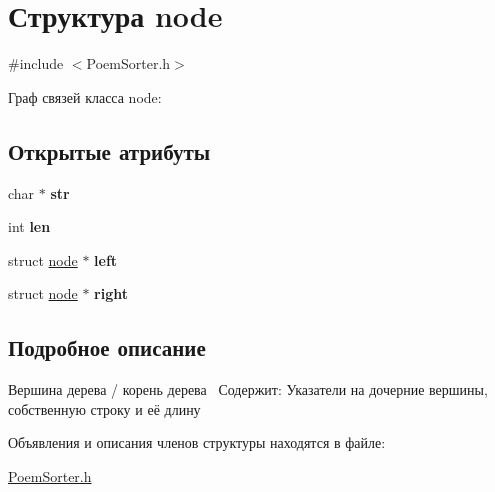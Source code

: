 \hypertarget{structnode}{}\section{Структура node}
\label{structnode}


{\ttfamily \#include $<$Poem\+Sorter.\+h$>$}



Граф связей класса node\+:
\subsection*{Открытые атрибуты}
\begin{DoxyCompactItemize}
\item 
\mbox{\label{structnode_ab87bb77f53624928d8241d835150524e}} 
char $\ast$ {\bfseries str}
\item 
\mbox{\label{structnode_a3f3dc96b95e9ee02b79ff034a5175bee}} 
int {\bfseries len}
\item 
\mbox{\label{structnode_a3ce38490a651bfda86d88ff955e96abc}} 
struct \hyperlink{structnode}{node} $\ast$ {\bfseries left}
\item 
\mbox{\label{structnode_a875f75abfe22103500535b179828e4e3}} 
struct \hyperlink{structnode}{node} $\ast$ {\bfseries right}
\end{DoxyCompactItemize}


\subsection{Подробное описание}
Вершина дерева / корень дерева~\newline
Содержит\+: Указатели на дочерние вершины, собственную строку и её длину 

Объявления и описания членов структуры находятся в файле\+:\begin{DoxyCompactItemize}
\item 
\hyperlink{PoemSorter_8h}{Poem\+Sorter.\+h}\end{DoxyCompactItemize}
